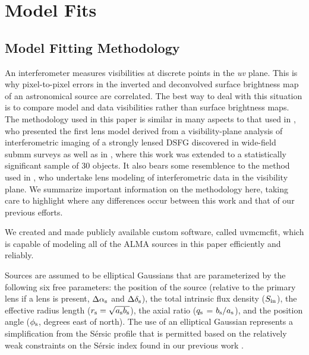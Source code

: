 \documentclass[iop]{emulateapj}
\begin{document}
\section{Model Fits}\label{sec:modelfits}

\subsection{Model Fitting Methodology}\label{sec:modelfitsmeth}

An interferometer measures visibilities at discrete points in the {\it uv}
plane.  This is why pixel-to-pixel errors in the inverted and deconvolved
surface brightness map of an astronomical source are correlated.  The best way
to deal with this situation is to compare model and data visibilities rather
than surface brightness maps.  The methodology used in this paper is similar in
many aspects to that used in \citet{Bussmann:2012lr}, who presented the first
lens model derived from a visibility-plane analysis of interferometric imaging
of a strongly lensed DSFG discovered in wide-field submm surveys as well as in
\citet{Bussmann:2013lr}, where this work was extended to a
statistically significant sample of 30 objects.  It also bears some resemblence
to the method used in \citet{Hezaveh:2013fk}, who undertake lens modeling of
interferometric data in the visibility plane.  We summarize important
information on the methodology here, taking care to highlight where any
differences occur between this work and that of our previous efforts.

We created and made publicly available custom software, called {\sc uvmcmcfit},
which is capable of modeling all of the ALMA sources in this paper efficiently
and reliably.  

Sources are assumed to be elliptical Gaussians that are parameterized by the
following six free parameters: the position of the source (relative to the
primary lens if a lens is present, $\Delta \alpha_{\rm s}$ and $\Delta
\delta_{\rm s}$), the total intrinsic flux density ($S_{\rm in}$), the
effective radius length ($r_{\rm s} = \sqrt{a_{\rm s} b_{\rm s}}$), the axial
ratio ($q_{\rm s}$ =  $b_{\rm s}/a_{\rm s}$), and the position angle
($\phi_{\rm s}$, degrees east of north).  The use of an elliptical Gaussian
represents a simplification from the S\'ersic profile
\citep{1968adga.book.....S}  that is permitted based on the relatively weak
constraints on the S\'ersic index found in our previous work
\citep{Bussmann:2012lr, Bussmann:2013lr}.
\end{document}
